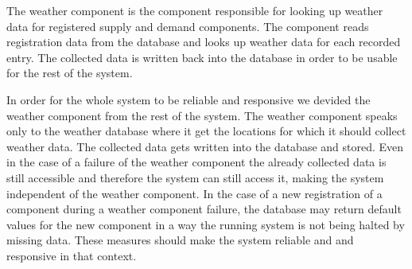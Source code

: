 The weather component is the component responsible for looking up weather data for registered supply and demand components.
The component reads registration data from the database and looks up weather data for each recorded entry.
The collected data is written back into the database in order to be usable for the rest of the system.

In order for the whole system to be reliable and responsive we devided the weather component from the rest of the system.
The weather component speaks only to the weather database where it get the locations for which it should collect weather data.
The collected data gets written into the database and stored.
Even in the case of a failure of the weather component the already collected data is still accessible and therefore the system can still access it, making the system independent of the weather component.
In the case of a new registration of a component during a weather component failure, the database may return default values for the new component in a way the running system is not being halted by missing data.
These measures should make the system reliable and and responsive in that context.